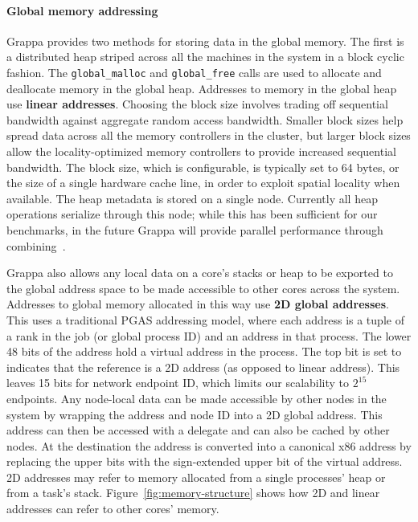 \paragraph{Global memory addressing} Grappa provides two methods for
storing data in the global memory. The first is a distributed heap
striped across all the machines in the system in a block cyclic fashion.
The \texttt{global\_malloc} and \texttt{global\_free} calls are used to
allocate and deallocate memory in the global heap.  Addresses to memory
in the global heap use \textbf{linear addresses}.  Choosing the block
size involves trading off sequential bandwidth against aggregate random
access bandwidth. Smaller block sizes help spread data across all the
memory controllers in the cluster, but larger block sizes allow the
locality-optimized memory controllers to provide increased sequential
bandwidth. The block size, which is configurable, is typically set to 64
bytes, or the size of a single hardware cache line, in order to exploit
spatial locality when available. The heap metadata is stored on a single
node. Currently all heap operations serialize through this node; while
this has been sufficient for our benchmarks, in the future Grappa will
provide parallel performance through combining~\cite{MAMA,flatcombining}.

Grappa also allows any local data on a core's stacks or heap to be
exported to the global address space to be made accessible to other
cores across the system. Addresses to global memory allocated in this
way use \textbf{2D global addresses}.  This uses a traditional PGAS
addressing model, where each address is a tuple of a rank in the job (or
global process ID) and an address in that process. The lower 48 bits of
the address hold a virtual address in the process. The top bit is set to
indicates that the reference is a 2D address (as opposed to linear
address). This leaves 15 bits for network endpoint ID, which limits our
scalability to $2^{15}$ endpoints. Any node-local data can be made
accessible by other nodes in the system by wrapping the address and node
ID into a 2D global address. This address can then be accessed with a
delegate and can also be cached by other nodes. At the destination the
address is converted into a canonical x86 address by replacing the upper
bits with the sign-extended upper bit of the virtual address. 2D
addresses may refer to memory allocated from a single processes' heap or
from a task's stack. Figure~\ref{fig:memory-structure} shows how 2D and
linear addresses can refer to other cores' memory.


